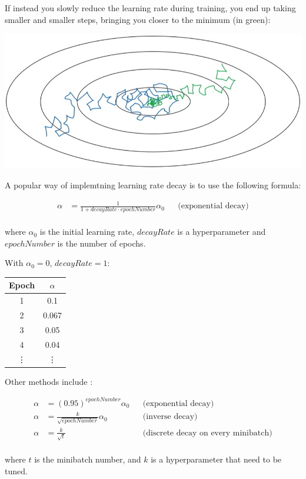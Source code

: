 If instead you slowly reduce the learning rate during training, you end up taking smaller and smaller steps, bringing you closer to the minimum (in green):

\includegraphics*[width=0.7\linewidth]{images/gd_with_lr_decay.png}

A popular way of implemtning learning rate decay is to use the following formula:

\begin{align*}
    \alpha &= \frac{1}{1+decayRate \cdot epochNumber} \alpha_0 & & \text{(exponential decay)} \\
\end{align*}

where $\alpha_0$ is the initial learning rate, $decayRate$ is a hyperparameter and $epochNumber$ is the number of epochs.

With $\alpha_0 = 0$, $decayRate = 1$:

\begin{tabular}{|c|c|}
    \hline
    Epoch & $\alpha$ \\
    \hline
    1 & 0.1 \\
    \hline
    2 & 0.067 \\
    \hline
    3 & 0.05 \\
    \hline
    4 & 0.04 \\
    \hline
    \vdots & \vdots \\
    \hline
\end{tabular}

Other methods include :

\begin{align*}
    \alpha & = (0.95)^{epochNumber}\alpha_0           & &\text{(exponential decay)} \\
    \alpha &= \frac{k}{\sqrt{epochNumber}} \alpha_0   & &\text{(inverse decay)} \\
    \alpha &= \frac{k}{\sqrt{t}}                       & &\text{(discrete decay on every minibatch)} \\
\end{align*}

where $t$ is the minibatch number, and $k$ is a hyperparameter that need to be tuned.

